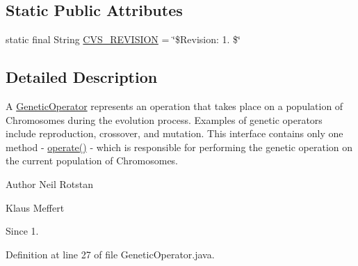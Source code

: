 \subsection*{Static Public Attributes}
\begin{DoxyCompactItemize}
\item 
static final String \hyperlink{interfaceorg_1_1jgap_1_1_genetic_operator_ad0ddbf3fa1dfd7bd8639eba1d9e35267}{C\-V\-S\-\_\-\-R\-E\-V\-I\-S\-I\-O\-N} = \char`\"{}\$Revision\-: 1. \$\char`\"{}
\end{DoxyCompactItemize}


\subsection{Detailed Description}
A \hyperlink{interfaceorg_1_1jgap_1_1_genetic_operator}{Genetic\-Operator} represents an operation that takes place on a population of Chromosomes during the evolution process. Examples of genetic operators include reproduction, crossover, and mutation. This interface contains only one method -\/ \hyperlink{interfaceorg_1_1jgap_1_1_genetic_operator_a0f9dfe925c4c21e07522be67d6c5d084}{operate()} -\/ which is responsible for performing the genetic operation on the current population of Chromosomes.

\begin{DoxyAuthor}{Author}
Neil Rotstan 

Klaus Meffert 
\end{DoxyAuthor}
\begin{DoxySince}{Since}
1. 
\end{DoxySince}


Definition at line 27 of file Genetic\-Operator.\-java.




